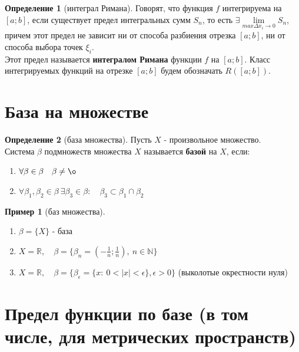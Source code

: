 \documentclass{report}
\theoremstyle{definition}
\newtheorem*{definition}{Определение}
\newtheorem*{example}{Пример}
\begin{document}
\begin{definition}[интеграл Римана]
    Говорят, что функция $f$ интегрируема на $[a;b]$, если существует предел интегральных сумм $S_{n}$, то есть
    $\exists \underset{max\Delta x_{i}\rightarrow0}{\lim}S_{n}$, причем этот предел не зависит ни от способа разбиения
    отрезка $[a;b]$, ни от способа выбора точек $\xi_{i}$.\\

    Этот предел называется \textbf{интегралом Римана} функции $f$ на $[a;b]$. Класс интегрируемых функций на отрезке
    $[a;b]$ будем обозначать $R([a;b])$.
\end{definition}

\section{База на множестве}

\begin{definition}[база множества]
    Пусть $X$ - произвольное множество.\\

    Система $\beta$ подмножеств множества $X$ называется \textbf{базой} на $X$, если:
    \begin{enumerate}
        \item $\forall \beta \in \beta \quad \beta \ne \o$
        \item $\forall \beta_{1}, \beta_{2} \in \beta \ \exists \beta_{3} \in \beta: \quad \beta_{3} \subset \beta_{1}
                  \cap \beta_{2}$
    \end{enumerate}
\end{definition}

\begin{example}[баз множества]
    \begin{enumerate}
        \item $\beta = \{X\}$ - база
        \item $X = \mathbb{R}, \quad \beta = \{\beta_{n} = (-\frac{1}{n};\frac{1}{n}), \ n \in \mathbb{N}\}$
        \item $X = \mathbb{R}, \quad \beta = \{\beta_{\epsilon} = \{x: \  0 < |x| < \epsilon\}, \epsilon > 0\}$
              (выколотые окрестности нуля)
    \end{enumerate}
\end{example}

\section{Предел функции по базе (в том числе, для метрических пространств)}
\end{document}
